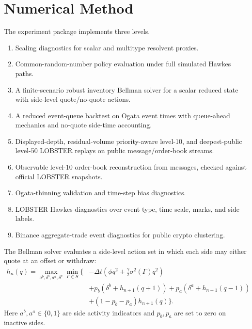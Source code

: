 \documentclass[11pt]{article}
\begin{document}
\section{Numerical Method}

The experiment package implements three levels.

\begin{enumerate}[nosep]
\item Scaling diagnostics for scalar and multitype resolvent proxies.
\item Common-random-number policy evaluation under full simulated Hawkes paths.
\item A finite-scenario robust inventory Bellman solver for a scalar reduced
state with side-level quote/no-quote actions.
\item A reduced event-queue backtest on Ogata event times with queue-ahead
mechanics and no-quote side-time accounting.
\item Displayed-depth, residual-volume priority-aware level-10, and
deepest-public level-50 LOBSTER replays on public message/order-book streams.
\item Observable level-10 order-book reconstruction from messages, checked
against official LOBSTER snapshots.
\item Ogata-thinning validation and time-step bias diagnostics.
\item LOBSTER Hawkes diagnostics over event type, time scale, marks, and side
labels.
\item Binance aggregate-trade event diagnostics for public crypto clustering.
\end{enumerate}

The Bellman solver evaluates a side-level action set in which each side may
either quote at an offset or withdraw:
\begin{align*}
h_n(q)=\max_{a^b,\delta^b,a^a,\delta^a}\min_{\Gamma\in S}\Big\{&
-\Delta t\left(\phi q^2+\frac{\gamma}{2}\sigma^2(\Gamma)q^2\right)\\
&+p_b(\delta^b+h_{n+1}(q+1))
+p_a(\delta^a+h_{n+1}(q-1))\\
&+(1-p_b-p_a)h_{n+1}(q)\Big\}.
\end{align*}
Here $a^b,a^a\in\{0,1\}$ are side activity indicators and $p_b,p_a$ are set to
zero on inactive sides.
\end{document}
